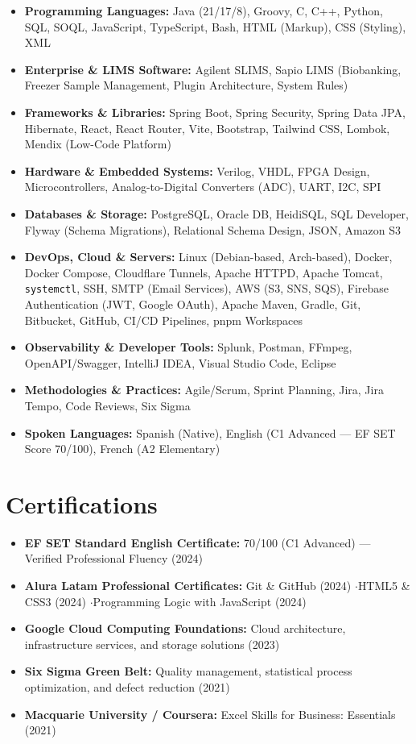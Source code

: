 \documentclass[10pt, letterpaper]{article}
\begin{document}
\begin{itemize}[leftmargin=0.8em, itemsep=2pt]
    \item \textbf{Programming Languages:} Java (21/17/8), Groovy, C, C++, Python, SQL, SOQL, JavaScript, TypeScript, Bash, HTML (Markup), CSS (Styling), XML
    \item \textbf{Enterprise \& LIMS Software:} Agilent SLIMS, Sapio LIMS (Biobanking, Freezer Sample Management, Plugin Architecture, System Rules)
    \item \textbf{Frameworks \& Libraries:} Spring Boot, Spring Security, Spring Data JPA, Hibernate, React, React Router, Vite, Bootstrap, Tailwind CSS, Lombok, Mendix (Low-Code Platform)
    \item \textbf{Hardware \& Embedded Systems:} Verilog, VHDL, FPGA Design, Microcontrollers, Analog-to-Digital Converters (ADC), UART, I2C, SPI
    \item \textbf{Databases \& Storage:} PostgreSQL, Oracle DB, HeidiSQL, SQL Developer, Flyway (Schema Migrations), Relational Schema Design, JSON, Amazon S3
    \item \textbf{DevOps, Cloud \& Servers:} Linux (Debian-based, Arch-based), Docker, Docker Compose, Cloudflare Tunnels, Apache HTTPD, Apache Tomcat, \texttt{systemctl}, SSH, SMTP (Email Services), AWS (S3, SNS, SQS), Firebase Authentication (JWT, Google OAuth), Apache Maven, Gradle, Git, Bitbucket, GitHub, CI/CD Pipelines, pnpm Workspaces
    \item \textbf{Observability \& Developer Tools:} Splunk, Postman, FFmpeg, OpenAPI/Swagger, IntelliJ IDEA, Visual Studio Code, Eclipse
    \item \textbf{Methodologies \& Practices:} Agile/Scrum, Sprint Planning, Jira, Jira Tempo, Code Reviews, Six Sigma
    \item \textbf{Spoken Languages:} Spanish (Native), English (C1 Advanced --- EF SET Score 70/100), French (A2 Elementary)
\end{itemize}

\section{Certifications}

\begin{itemize}[leftmargin=0.8em, itemsep=1.5pt]
    \item \textbf{EF SET Standard English Certificate:} 70/100 (C1 Advanced) --- Verified Professional Fluency (2024)
    \item \textbf{Alura Latam Professional Certificates:} Git \& GitHub (2024) \enspace$\cdot$\enspace HTML5 \& CSS3 (2024) \enspace$\cdot$\enspace Programming Logic with JavaScript (2024)
    \item \textbf{Google Cloud Computing Foundations:} Cloud architecture, infrastructure services, and storage solutions (2023)
    \item \textbf{Six Sigma Green Belt:} Quality management, statistical process optimization, and defect reduction (2021)
    \item \textbf{Macquarie University / Coursera:} Excel Skills for Business: Essentials (2021)
\end{itemize}
\end{document}
